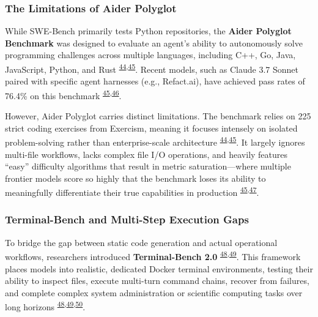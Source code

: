 \documentclass[
  11pt,
]{article}
\begin{document}
\hypertarget{the-limitations-of-aider-polyglot}{%
\subsubsection{The Limitations of Aider
Polyglot}\label{the-limitations-of-aider-polyglot}}

While SWE-Bench primarily tests Python repositories, the \textbf{Aider
Polyglot Benchmark} was designed to evaluate an agent's ability to
autonomously solve programming challenges across multiple languages,
including C++, Go, Java, JavaScript, Python, and Rust
\textsuperscript{\protect\hyperlink{cite-44}{44},\protect\hyperlink{cite-45}{45}}.
Recent models, such as Claude 3.7 Sonnet paired with specific agent
harnesses (e.g., Refact.ai), have achieved pass rates of 76.4\% on this
benchmark
\textsuperscript{\protect\hyperlink{cite-45}{45},\protect\hyperlink{cite-46}{46}}.

However, Aider Polyglot carries distinct limitations. The benchmark
relies on 225 strict coding exercises from Exercism, meaning it focuses
intensely on isolated problem-solving rather than enterprise-scale
architecture
\textsuperscript{\protect\hyperlink{cite-44}{44},\protect\hyperlink{cite-45}{45}}.
It largely ignores multi-file workflows, lacks complex file I/O
operations, and heavily features ``easy'' difficulty algorithms that
result in metric saturation---where multiple frontier models score so
highly that the benchmark loses its ability to meaningfully
differentiate their true capabilities in production
\textsuperscript{\protect\hyperlink{cite-45}{45},\protect\hyperlink{cite-47}{47}}.

\hypertarget{terminal-bench-and-multi-step-execution-gaps}{%
\subsubsection{Terminal-Bench and Multi-Step Execution
Gaps}\label{terminal-bench-and-multi-step-execution-gaps}}

To bridge the gap between static code generation and actual operational
workflows, researchers introduced \textbf{Terminal-Bench 2.0}
\textsuperscript{\protect\hyperlink{cite-48}{48},\protect\hyperlink{cite-49}{49}}.
This framework places models into realistic, dedicated Docker terminal
environments, testing their ability to inspect files, execute multi-turn
command chains, recover from failures, and complete complex system
administration or scientific computing tasks over long horizons
\textsuperscript{\protect\hyperlink{cite-48}{48},\protect\hyperlink{cite-49}{49},\protect\hyperlink{cite-50}{50}}.
\end{document}
